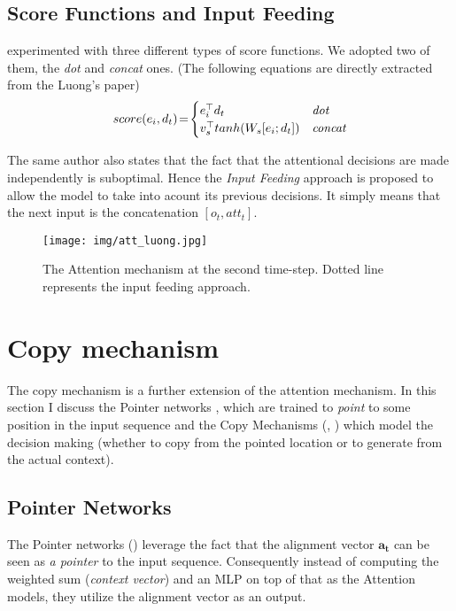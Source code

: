 \subsection{Score Functions and Input Feeding}
\citep{luong2015effective} experimented with three different types of score functions. We adopted two of them, the \emph{dot} and \emph{concat} ones. (The following equations are directly extracted from the Luong's paper)
\begin{equation*}
score(e_i, d_t)\!=\!\begin{cases}
    e_i^\top d_t & \mbox{{\it dot}}\\
    v_s^\top tanh(W_s[e_i ; d_t]) & \mbox{{\it concat}}
\end{cases}
\end{equation*}

The same author also states that the fact that the attentional decisions are made independently is suboptimal. Hence the \emph{Input Feeding} approach is proposed to allow the model to take into acount its previous decisions. It simply means that the next input is the concatenation $[o_t, att_t]$.

\begin{figure}[!h]
    \centering
    \texttt{[image: img/att\_luong.jpg]}
    \caption{\centering The Attention mechanism at the second time-step. Dotted line represents the input feeding approach.}
\end{figure}


\section{Copy mechanism}
The copy mechanism is a further extension of the attention mechanism. In this section I discuss the Pointer networks \citep{vinyals2015pointer}, which are trained to \emph{point} to some position in the input sequence and the Copy Mechanisms (\citep{gulcehre2016pointing}, \citep{gu2016incorporating}) which model the decision making (whether to copy from the pointed location or to generate from the actual context).

\subsection{Pointer Networks}

The Pointer networks (\citep{vinyals2015pointer}) leverage the fact that the alignment vector $\mathbf{a_t}$  can be seen as \emph{a pointer} to the input sequence. Consequently instead of computing the weighted sum (\emph{context vector}) and an MLP on top of that as the Attention models, they utilize the alignment vector as an output.

